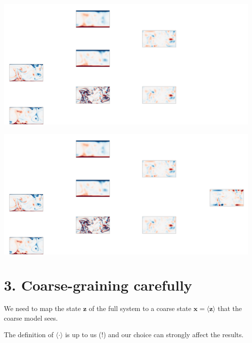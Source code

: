 \documentclass[12pt, aspectratio=169]{beamer}
\renewcommand\vec{\bm}
\begin{document}
\begin{frame}
\centering
\includegraphics[width=\linewidth]{figures/method5.pdf}
\end{frame}

\begin{frame}
\centering
\includegraphics[width=\linewidth]{figures/method6.pdf}
\end{frame}

\section{3. Coarse-graining carefully}

\begin{frame}
We need to map the state $\vec{z}$ of the full system to a coarse state
$\vec{x} = \langle \vec{z} \rangle$ that the coarse model sees.

\vspace{20pt}
The definition of $\langle \cdot \rangle$ is up to us (!) and our choice
can strongly affect the results.
\end{frame}
\end{document}
